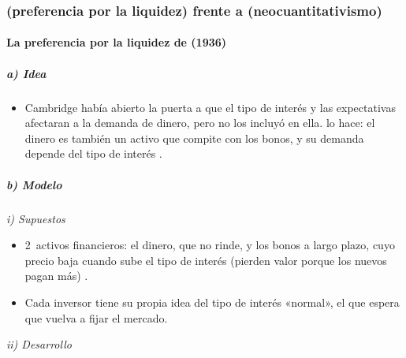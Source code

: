 \documentclass[11pt]{article}
\begin{document}
\subsubsection{ (preferencia por la liquidez) frente a  (neocuantitativismo)}\label{sec:keynes-friedman}

\paragraph{La preferencia por la liquidez de  (1936)}

\subparagraph{a) Idea}

\begin{itemize}
\item Cambridge había abierto la puerta a que el tipo de interés y las expectativas afectaran a la demanda de dinero, pero no los incluyó en ella. \textcite{Keynes1936} lo hace: el dinero es también un activo que compite con los bonos, y su demanda depende del tipo de interés .
\end{itemize}

\subparagraph{b) Modelo}

\hspace*{3.6em}\emph{i) Supuestos}

\begin{itemize}
\item 2~activos financieros: el dinero, que no rinde, y los bonos a largo plazo, cuyo precio baja cuando sube el tipo de interés (pierden valor porque los nuevos pagan más) .
\item Cada inversor tiene su propia idea del tipo de interés «normal», el que espera que vuelva a fijar el mercado.
\end{itemize}

\hspace*{3.6em}\emph{ii) Desarrollo}
\end{document}

